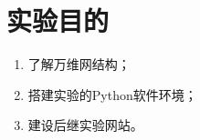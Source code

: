\section{实验目的}
\begin{enumerate}
    \item 了解万维网结构；
    \item 搭建实验的Python软件环境；
    \item 建设后继实验网站。
\end{enumerate}